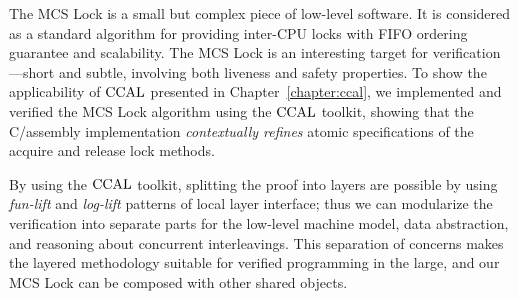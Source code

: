 
The MCS Lock is a small but complex piece of low-level software.
It is considered as a standard algorithm for providing inter-CPU locks with FIFO ordering guarantee and scalability.
The MCS Lock is an interesting target for verification---short and subtle, involving both liveness and safety properties. 
To show the applicability of $\mathrm{CCAL}$ presented in Chapter~\ref{chapter:ccal},
we implemented and verified the MCS Lock algorithm using the $\mathrm{CCAL}$ toolkit, 
showing that the C/assembly implementation {\em contextually refines} atomic specifications of the acquire and release lock methods.

By using the $\mathrm{CCAL}$ toolkit, splitting the proof into layers are possible by using \textit{fun-lift} and \textit{log-lift} patterns of local layer interface;
thus we can modularize the verification into separate parts for the low-level machine model, data abstraction, and reasoning about concurrent interleavings.
This separation of concerns makes the layered methodology suitable for verified programming in the large, and our 
MCS Lock can be composed with other shared objects.

